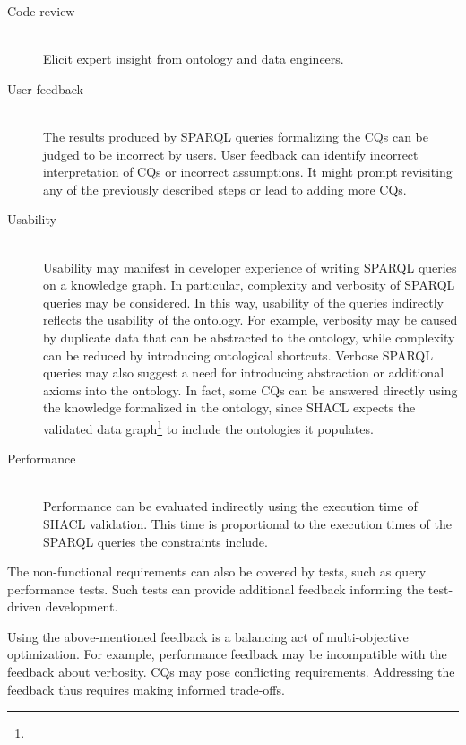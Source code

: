 \documentclass[
]{ceurart}
\begin{document}
\begin{description}
    \item[Code review] \hfill \\
    Elicit expert insight from ontology and data engineers.
    \item[User feedback] \hfill \\
    The results produced by SPARQL queries formalizing the CQs can be judged to be incorrect by users. User feedback can identify incorrect interpretation of CQs or incorrect assumptions. It might prompt revisiting any of the previously described steps or lead to adding more CQs.
    \item[Usability] \hfill \\
    Usability may manifest in developer experience of writing SPARQL queries on a knowledge graph. In particular, complexity and verbosity of SPARQL queries may be considered. In this way, usability of the queries indirectly reflects the usability of the ontology. For example, verbosity may be caused by duplicate data that can be abstracted to the ontology, while complexity can be reduced by introducing ontological shortcuts. Verbose SPARQL queries may also suggest a need for introducing abstraction or additional axioms into the ontology. In fact, some CQs can be answered directly using the knowledge formalized in the ontology, since SHACL expects the validated data graph\footnote{\urlschaclgraphdata} to include the ontologies it populates.
    \item[Performance] \hfill \\
    Performance can be evaluated indirectly using the execution time of SHACL validation. This time is proportional to the execution times of the SPARQL queries the constraints include.
\end{description}

The non-functional requirements can also be covered by tests, such as query performance tests. Such tests can provide additional feedback informing the test-driven development.

Using the above-mentioned feedback is a balancing act of multi-objective optimization. For example, performance feedback may be incompatible with the feedback about verbosity. CQs may pose conflicting requirements. Addressing the feedback thus requires making informed trade-offs.
\end{document}
